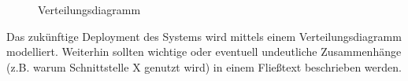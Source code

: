 \begin{figure}[h]
	\centering
	\caption{Verteilungsdiagramm}
	\label{fig:verteilungsdiagramm}
\end{figure}

\begin{tcolorbox}
	Das zukünftige Deployment des Systems wird mittels einem Verteilungsdiagramm modelliert.
	Weiterhin sollten wichtige oder eventuell undeutliche Zusammenhänge (z.B. warum Schnittstelle X genutzt wird) in einem Fließtext beschrieben werden.
\end{tcolorbox}